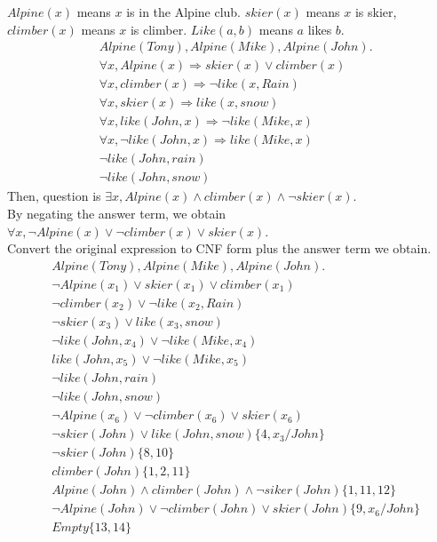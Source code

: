 \normalfont\documentclass[letterpaper,11pt]{article}
\begin{document}
\begin{enumerate}
	$Alpine(x)$ means $x$ is in the Alpine club. $skier(x)$ means $x$ is skier, $climber(x)$ means $x$ is climber. $Like(a,b)$ means $a$ likes $b$.
	\begin{align*}
		&Alpine(Tony), Alpine(Mike), Alpine(John).\\
		&\forall x, Alpine(x)  \Rightarrow skier(x)\lor climber(x)\\
		&\forall x, climber(x) \Rightarrow \neg like(x,Rain) \\
		&\forall x, skier(x) \Rightarrow like(x,snow) \\
		&\forall x, like(John, x) \Rightarrow \neg like(Mike, x)\\
		&\forall x, \neg like(John, x) \Rightarrow like(Mike, x)\\
		&\neg like(John, rain)\\
		&\neg like(John, snow)
	\end{align*}
	Then, question is
	$\exists x,Alpine(x) \land climber(x) \land \neg skier(x)$.\\
	By negating the answer term, we obtain $\forall x,\neg Alpine(x) \lor \neg climber(x) \lor skier(x)$.\\
	Convert the original expression to CNF form plus the answer term we obtain.
	\begin{align}
		&Alpine(Tony), Alpine(Mike), Alpine(John).\\
		&\neg Alpine(x_1)  \lor skier(x_1)\lor climber(x_1)\\
		&\neg climber(x_2) \lor \neg like(x_2,Rain) \\
		&\neg skier(x_3) \lor like(x_3,snow) \\
		&\neg like(John, x_4) \lor \neg like(Mike, x_4)\\
		&like(John, x_5) \lor \neg like(Mike, x_5)\\
		&\neg like(John, rain)\\
		&\neg like(John, snow)\\
		&\neg Alpine(x_6) \lor \neg climber(x_6) \lor skier(x_6)\\
		&\neg skier(John) \lor like(John,snow)\{4,x_3/John\} \\
		&\neg skier(John)\{8,10\}\\
		& climber(John)\{1,2,11\}\\
		& Alpine(John) \land climber(John) \land \neg siker(John)\{1,11,12\}\\
		&\neg Alpine(John) \lor \neg climber(John) \lor skier(John)\{9,x_6/John\}\\
		&Empty\{13,14\}
	\end{align}

\end{enumerate}
\end{document}
